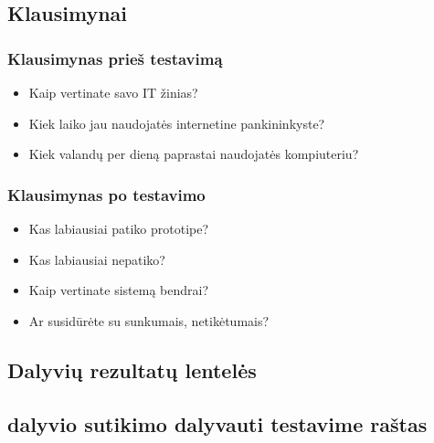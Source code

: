 \documentclass[oneside]{VUMIFPSkursinis}
\begin{document}
\subsection{Klausimynai}
\subsubsection{Klausimynas prieš testavimą}
\begin{itemize}
	\item Kaip vertinate savo IT žinias?
	\item Kiek laiko jau naudojatės internetine pankininkyste?
	\item Kiek valandų per dieną paprastai naudojatės kompiuteriu?
\end{itemize}
\subsubsection{Klausimynas po testavimo}
	\begin{itemize}
			\item Kas labiausiai patiko prototipe?
			\item Kas labiausiai nepatiko?
			\item Kaip vertinate sistemą bendrai?
			\item Ar susidūrėte su sunkumais, netikėtumais?
	\end{itemize}
\subsection{Dalyvių rezultatų lentelės}
\subsection{dalyvio sutikimo dalyvauti testavime raštas}
\end{document}
